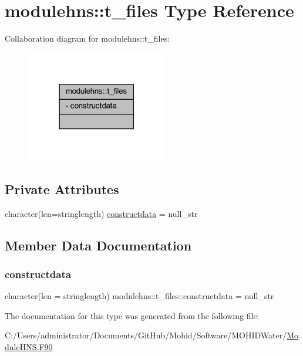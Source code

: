 \hypertarget{structmodulehns_1_1t__files}{}\section{modulehns\+:\+:t\+\_\+files Type Reference}
\label{structmodulehns_1_1t__files}


Collaboration diagram for modulehns\+:\+:t\+\_\+files\+:\nopagebreak
\begin{figure}[H]
\begin{center}
\leavevmode
\includegraphics[width=175pt]{structmodulehns_1_1t__files__coll__graph}
\end{center}
\end{figure}
\subsection*{Private Attributes}
\begin{DoxyCompactItemize}
\item 
character(len=stringlength) \mbox{\hyperlink{structmodulehns_1_1t__files_a74b1a7c3e18c90ae2275561322d7605b}{constructdata}} = null\+\_\+str
\end{DoxyCompactItemize}


\subsection{Member Data Documentation}
\mbox{\label{structmodulehns_1_1t__files_a74b1a7c3e18c90ae2275561322d7605b}} 
\subsubsection{\texorpdfstring{constructdata}{constructdata}}
{\footnotesize\ttfamily character(len = stringlength) modulehns\+::t\+\_\+files\+::constructdata = null\+\_\+str\hspace{0.3cm}{\ttfamily [private]}}



The documentation for this type was generated from the following file\+:\begin{DoxyCompactItemize}
\item 
C\+:/\+Users/administrator/\+Documents/\+Git\+Hub/\+Mohid/\+Software/\+M\+O\+H\+I\+D\+Water/\mbox{\hyperlink{_module_h_n_s_8_f90}{Module\+H\+N\+S.\+F90}}\end{DoxyCompactItemize}
